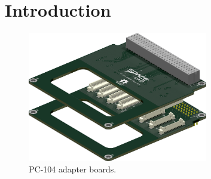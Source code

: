 %
%
%
%
%

%
%
%
%
%
%

\chapter{Introduction} \label{ch:introduction}

\cite{pc104-adapter}

\cite{kicad}

\begin{figure}[!htb]
    \begin{center}
        \includegraphics[width=0.7\textwidth]{figures/pc104-adapter}
        \caption{PC-104 adapter boards.}
        \label{fig:pc104-adapter}
    \end{center}
\end{figure}

